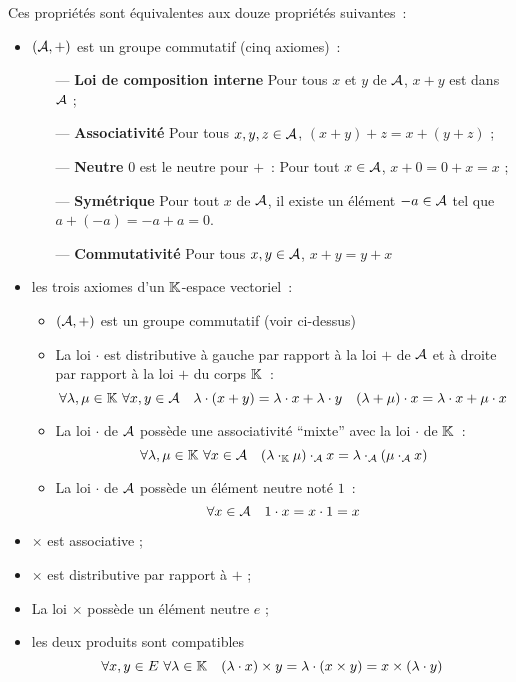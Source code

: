 Ces propriétés sont équivalentes aux douze propriétés suivantes~:
\begin{itemize}
	\item $(\mathcal{A}, +)$ est un groupe commutatif (cinq axiomes)~:
	\begin{itemize}
		\item[--- \textbf{Loi de composition interne}] Pour tous $x$ et $y$ de $\mathcal{A}$, $x+y$ est dans $\mathcal{A}$ ;
		\item[--- \textbf{Associativité}] Pour tous $x, y, z \in \mathcal{A}$, $(x+y)+z = x+(y+z)$ ;
		\item[--- \textbf{Neutre}] $0$ est le neutre pour $+$~: Pour tout $x \in \mathcal{A}$, $x+0=0+x=x$ ;
		\item[--- \textbf{Symétrique}] Pour tout $x$ de $\mathcal{A}$, il existe un élément $-a \in \mathcal{A}$ tel que $a+(-a) = -a+a = 0$.
		\item[--- \textbf{Commutativité}] Pour tous $x,y \in \mathcal{A}$, $x+y=y+x$
	\end{itemize}
	\item les  trois axiomes d'un $\mathbb{K}$-espace vectoriel~:
	\begin{itemize}
		\item $(\mathcal{A}, +)$ est un groupe commutatif (voir ci-dessus)
		\item La loi $\cdot$ est distributive à gauche par rapport à la loi $+$ de $\mathcal{A}$ et à droite par rapport à la loi $+$ du corps $\mathbb{K}$~:
		\begin{equation}
			\forall \lambda, \mu \in \mathbb{K} \ \forall x,y \in \mathcal{A} \quad \lambda \cdot (x+y) = \lambda \cdot x + \lambda \cdot y \quad (\lambda+\mu) \cdot x = \lambda \cdot x + \mu \cdot x 
		\end{equation}
	   	\item La loi $\cdot$ de $\mathcal{A}$ possède une associativité ``mixte'' avec la loi $\cdot$ de $\mathbb{K}$~:
	   	\begin{equation}
	   			\forall \lambda, \mu \in \mathbb{K} \ \forall x \in \mathcal{A} \quad (\lambda \cdot_{\mathbb{K}} \mu)\cdot_{\mathcal{A}} x = \lambda \cdot_{\mathcal{A}} (\mu \cdot_{\mathcal{A}} x)	
	   	\end{equation}
   		\item La loi $\cdot$ de $\mathcal{A}$ possède un élément neutre noté $1$~:
   			\begin{equation}
   			\forall x \in \mathcal{A} \quad 1 \cdot x = x \cdot 1 = x
   		\end{equation}
	\end{itemize}
	\item $\times$ est associative ;
	\item $\times$ est distributive par rapport à $+$ ;
	\item La loi $\times$ possède un élément neutre $e$ ;
	\item les deux produits sont compatibles
			\begin{equation}
				\forall x,y \in E \ \forall \lambda \in \mathbb{K} \quad (\lambda \cdot x) \times y = \lambda \cdot (x \times y) = x \times (\lambda \cdot y)
			\end{equation}	
\end{itemize}
